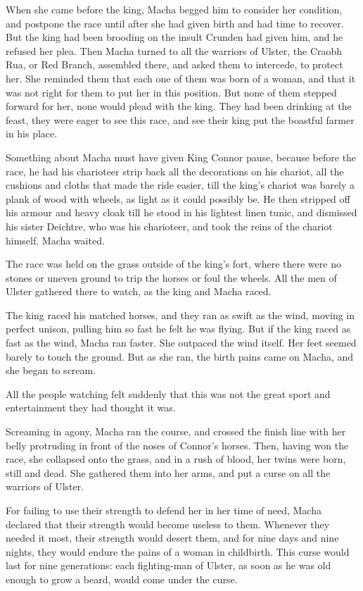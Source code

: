 \documentclass[colorlinks,12pt,a4paper,normalphoto,withhyper,ragged2e]{altareport}
\begin{document}
When she came before the king, Macha begged him to consider her condition, and postpone the race until after she had given birth and had time to recover. But the king had been brooding on the insult Crunden had given him, and he refused her plea. Then Macha turned to all the warriors of Ulster, the Craobh Rua, or Red Branch, assembled there, and asked them to intercede, to protect her. She reminded them that each one of them was born of a woman, and that it was not right for them to put her in this position. But none of them stepped forward for her, none would plead with the king. They had been drinking at the feast, they were eager to see this race, and see their king put the boastful farmer in his place.

Something about Macha must have given King Connor pause, because before the race, he had his charioteer strip back all the decorations on his chariot, all the cushions and cloths that made the ride easier, till the king’s chariot was barely a plank of wood with wheels, as light as it could possibly be. He then stripped off his armour and heavy cloak till he stood in his lightest linen tunic, and dismissed his sister Deichtre, who was his charioteer, and took the reins of the chariot himself. Macha waited.

The race was held on the grass outside of the king’s fort, where there were no stones or uneven ground to trip the horses or foul the wheels. All the men of Ulster gathered there to watch, as the king and Macha raced.

The king raced his matched horses, and they ran as swift as the wind, moving in perfect unison, pulling him so fast he felt he was flying. But if the king raced as fast as the wind, Macha ran faster. She outpaced the wind itself. Her feet seemed barely to touch the ground. But as she ran, the birth pains came on Macha, and she began to scream.

All the people watching felt suddenly that this was not the great sport and entertainment they had thought it was.

Screaming in agony, Macha ran the course, and crossed the finish line with her belly protruding in front of the noses of Connor’s horses. Then, having won the race, she collapsed onto the grass, and in a rush of blood, her twins were born, still and dead. She gathered them into her arms, and put a curse on all the warriors of Ulster.

For failing to use their strength to defend her in her time of need, Macha declared that their strength would become useless to them. Whenever they needed it most, their strength would desert them, and for nine days and nine nights, they would endure the pains of a woman in childbirth. This curse would last for nine generations: each fighting-man of Ulster, as soon as he was old enough to grow a beard, would come under the curse.
\end{document}
